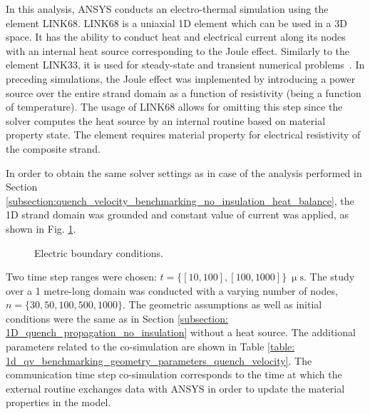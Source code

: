 
In this analysis, ANSYS conducts an electro-thermal simulation using the element LINK68. LINK68 is a uniaxial 1D element which can be used in a 3D space. It has the ability to conduct heat and electrical current along its nodes with an internal heat source corresponding to the Joule effect. Similarly to the element LINK33, it is used for steady-state and transient numerical problems~\cite{ansys_element_manual}. In preceding simulations, the Joule effect was implemented by introducing a power source over the entire strand domain as a function of resistivity (being a function of temperature). The usage of LINK68 allows for omitting this step since the solver computes the heat source by an internal routine based on material property state. The element requires material property for electrical resistivity of the composite strand.

In order to obtain the same solver settings as in case of the analysis performed in Section \ref{subsection:quench_velocity_benchmarking_no_insulation_heat_balance}, the 1D strand domain was grounded and constant value of current was applied, as shown in Fig. \ref{fig: q_vel_benchmarking_electrical_settings}.

\begin{figure}[H]
\centering
{}
\caption{Electric boundary conditions.}
\label{fig: q_vel_benchmarking_electrical_settings}
\end{figure}

Two time step ranges were chosen: $t=\{[10, 100], [100, 1000]\}~\upmu \text{s}$. The study over a 1 metre-long domain was conducted with a varying number of nodes, $n=\{30, 50, 100, 500, 1000\}$. The geometric assumptions as well as initial conditions were the same as in Section \ref{subsection: 1D_quench_propagation_no_insulation} without a heat source. The additional parameters related to the co-simulation are shown in Table \ref{table: 1d_qv_benchmarking_geometry_parameters_quench_velocity}. The communication time step co-simulation corresponds to the time at which the external routine exchanges data with ANSYS in order to update the material properties in the model. 

